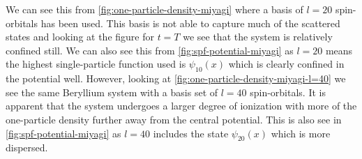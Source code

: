             We can see this from \autoref{fig:one-particle-density-miyagi}
            where a basis of $l = 20$ spin-orbitals has been used.
            This basis is not able to capture much of the scattered states and
            looking at the figure for $t = T$ we see that the system is
            relatively confined still.
            We can also see this from \autoref{fig:spf-potential-miyagi} as $l =
            20$ means the highest single-particle function used is
            $\psi_{10}(x)$ which is clearly confined in the potential well.
            However, looking at \autoref{fig:one-particle-density-miyagi-l=40}
            we see the same Beryllium system with a basis set of $l = 40$
            spin-orbitals.
            It is apparent that the system undergoes a larger degree of
            ionization with more of the one-particle density further away from
            the central potential.
            This is also see in \autoref{fig:spf-potential-miyagi} as $l = 40$
            includes the state $\psi_{20}(x)$ which is more dispersed.

